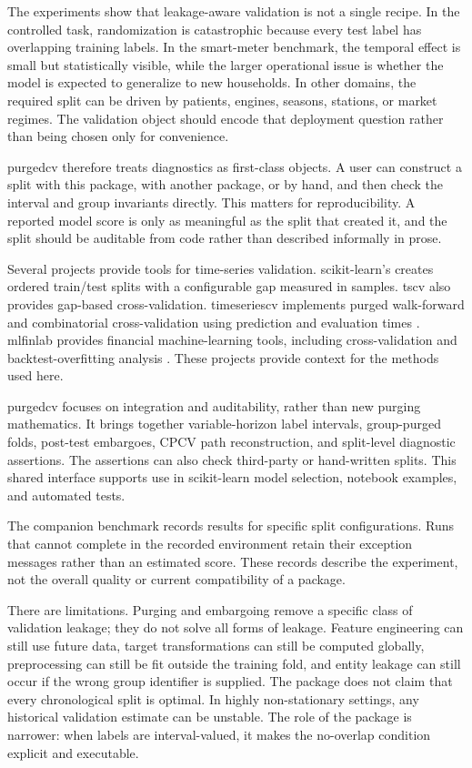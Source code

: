 \documentclass[10pt]{article}
\newcommand{\pcv}{\textsf{purgedcv}}
\newcommand{\pkg}[1]{\textsf{#1}}
\DeclareRobustCommand{\code}[1]{\texttt{\detokenize{#1}}}
\begin{document}
The experiments show that leakage-aware validation is not a single recipe. In
the controlled task, randomization is catastrophic because every test label has
overlapping training labels. In the smart-meter benchmark, the temporal effect
is small but statistically visible, while the larger operational issue is
whether the model is expected to generalize to new households. In other domains,
the required split can be driven by patients, engines, seasons, stations, or
market regimes. The validation object should encode that deployment question
rather than being chosen only for convenience.

\pcv{} therefore treats diagnostics as first-class objects. A user can
construct a split with this package, with another package, or by hand, and then
check the interval and group invariants directly. This matters for
reproducibility. A reported model score is only as meaningful as the split that
created it, and the split should be auditable from code rather than described
informally in prose.

Several projects provide tools for time-series validation.
\pkg{scikit-learn}'s \code{TimeSeriesSplit} creates ordered train/test splits
with a configurable gap measured in samples. \pkg{tscv} also provides
gap-based cross-validation. \pkg{timeseriescv} implements purged walk-forward
and combinatorial cross-validation using prediction and evaluation times
\citep{timeseriescv2018}. \pkg{mlfinlab} provides financial machine-learning
tools, including cross-validation and backtest-overfitting analysis
\citep{mlfinlab2026}. These projects provide context for the methods used here.

\pcv{} focuses on integration and auditability, rather than new purging
mathematics. It brings together variable-horizon label intervals, group-purged
folds, post-test embargoes, CPCV path reconstruction, and split-level diagnostic
assertions. The assertions can also check third-party or hand-written splits.
This shared interface supports use in \pkg{scikit-learn} model selection,
notebook examples, and automated tests.

The companion benchmark records results for specific split configurations.
Runs that cannot complete in the recorded environment retain their exception
messages rather than an estimated score. These records describe the experiment,
not the overall quality or current compatibility of a package.

There are limitations. Purging and embargoing remove a specific class of
validation leakage; they do not solve all forms of leakage. Feature engineering
can still use future data, target transformations can still be computed
globally, preprocessing can still be fit outside the training fold, and entity
leakage can still occur if the wrong group identifier is supplied. The package
does not claim that every chronological split is optimal. In highly
non-stationary settings, any historical validation estimate can be unstable. The
role of the package is narrower: when labels are interval-valued, it makes the
no-overlap condition explicit and executable.
\end{document}
